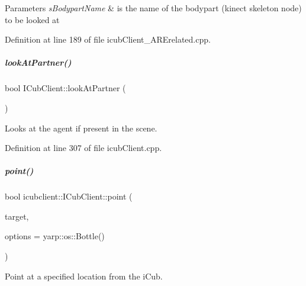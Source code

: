 \begin{DoxyParams}{Parameters}
{\em s\+Bodypart\+Name} & is the name of the bodypart (kinect skeleton node) to be looked at \\
\hline
\end{DoxyParams}


Definition at line 189 of file icub\+Client\+\_\+\+A\+R\+Erelated.\+cpp.

\mbox{\label{group__icubclient__clients_a7466b597efdf9ed613ab446e8cb46e25}} 
\subparagraph{\texorpdfstring{look\+At\+Partner()}{lookAtPartner()}}
{\footnotesize\ttfamily bool I\+Cub\+Client\+::look\+At\+Partner (\begin{DoxyParamCaption}{ }\end{DoxyParamCaption})}



Looks at the agent if present in the scene. 



Definition at line 307 of file icub\+Client.\+cpp.

\mbox{\label{group__icubclient__clients_a916d79977e918e349aee0b13567f9f18}} 
\subparagraph{\texorpdfstring{point()}{point()}\hspace{0.1cm}{\footnotesize\ttfamily [1/3]}}
{\footnotesize\ttfamily bool icubclient\+::\+I\+Cub\+Client\+::point (\begin{DoxyParamCaption}\item[{const yarp\+::sig\+::\+Vector\+Of$<$ double $>$ \&}]{target,  }\item[{const yarp\+::os\+::\+Bottle \&}]{options = {\ttfamily yarp\+:\+:os\+:\+:Bottle()} }\end{DoxyParamCaption})}



Point at a specified location from the i\+Cub. 

